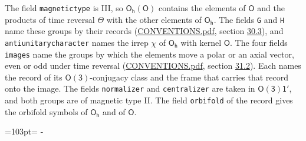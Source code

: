 \documentclass[10pt,a4paper]{article}
\newcommand{\needspace}[1]{\par\penalty-100\begingroup\dimen0=#1\relax\dimen2=\pagegoal
  \advance\dimen2-\pagetotal\ifdim\dimen0>\dimen2\relax\ifdim\dimen2>0pt\vfil\break\fi\fi
  \endgroup}
\numberwithin{equation}{section}
\newcommand{\grp}[1]{\mathsf{#1}}
\begin{document}
The field \texttt{magnetictype} is III, so $\grp{O_{h}}(\grp{O})$ contains the elements of $\grp{O}$ and the products of time reversal $\varTheta$ with the other elements of $\grp{O_{h}}$. The fields \texttt{G} and \texttt{H} name these groups by their records (\href{../../CONVENTIONS.pdf}{CONVENTIONS.pdf}, section \href{../../CONVENTIONS.pdf\#conv.30.3}{30.3}), and \texttt{antiunitarycharacter} names the irrep $\chi$ of $\grp{O_{h}}$ with kernel $\grp{O}$. The four fields \texttt{images} name the groups by which the elements move a polar or an axial vector, even or odd under time reversal (\href{../../CONVENTIONS.pdf}{CONVENTIONS.pdf}, section \href{../../CONVENTIONS.pdf\#conv.31.2}{31.2}). Each names the record of its $\grp{O(3)}$-conjugacy class and the frame that carries that record onto the image. The fields \texttt{normalizer} and \texttt{centralizer} are taken in $\grp{O(3)1'}$, and both groups are of magnetic type II. The field \texttt{orbifold} of the record gives the orbifold symbols of $\grp{O_{h}}$ and of $\grp{O}$.
\needspace{103pt}
\end{document}
